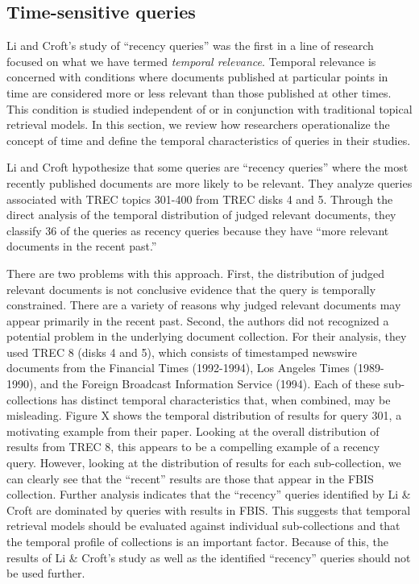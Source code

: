\documentclass{sig-alternate}
\begin{document}
\subsection{Time-sensitive queries}
Li and Croft's study of ``recency queries'' was the first in a line of research focused on what we have termed \emph{temporal relevance}. Temporal relevance is concerned with conditions where documents published at particular points in time are considered more or less relevant than those published at other times. This condition is studied independent of or in conjunction with traditional topical retrieval models.  In this section, we review how researchers operationalize the concept of time and define the temporal characteristics of queries in their studies. 

Li and Croft \cite{Li2003} hypothesize that some queries are ``recency queries'' where the most recently published documents are more likely to be relevant. They analyze queries associated with TREC topics 301-400 from TREC disks 4 and 5. Through the direct analysis of the temporal distribution of judged relevant documents, they classify 36 of the queries as recency queries because they have ``more relevant documents in the recent past.''

There are two problems with this approach. First, the distribution of judged relevant documents is not conclusive evidence that the query is temporally constrained. There are a variety of reasons why judged relevant documents may appear primarily in the recent past. Second, the authors did not recognized a potential problem in the underlying document collection.  For their analysis, they used TREC 8 (disks 4 and 5), which consists of timestamped newswire documents from the Financial Times (1992-1994), Los Angeles Times (1989-1990), and the Foreign Broadcast Information Service (1994).  Each of these sub-collections has distinct temporal characteristics that, when combined, may be misleading. Figure X shows the temporal distribution of results for query 301, a motivating example from their paper.  Looking at the overall distribution of results from TREC 8, this appears to be a compelling example of a recency query.   However, looking at the distribution of results for each sub-collection, we can clearly see that the ``recent'' results are those that appear in the FBIS collection.  Further analysis indicates that the ``recency'' queries identified by Li \& Croft are dominated by queries with results in FBIS.  This suggests that temporal retrieval models should be evaluated against individual sub-collections and that the temporal profile of collections is an important factor.  Because of this, the results of Li \& Croft's study as well as the identified ``recency'' queries should not be used further.
\end{document}
